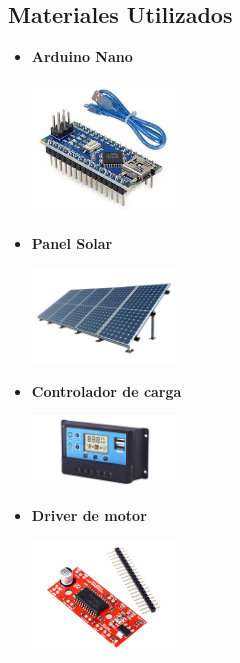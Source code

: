 \documentclass[12pt]{article}
\begin{document}
\subsection*{Materiales Utilizados}
\begin{itemize}
      \item \textbf{Arduino Nano}
            \begin{center}
                  \includegraphics[width=0.3\textwidth]{imagenes/arduino.jpg}
            \end{center}

      \item \textbf{Panel Solar}
            \begin{center}
                  \includegraphics[width=0.3\textwidth]{imagenes/pane.png}
            \end{center}

      \item \textbf{Controlador de carga}
            \begin{center}
                  \includegraphics[width=0.3\textwidth]{imagenes/controlaor.png}
            \end{center}

      \item \textbf{Driver de motor}
            \begin{center}
                  \includegraphics[width=0.3\textwidth]{imagenes/motor.png}
            \end{center}


\end{itemize}
\end{document}
